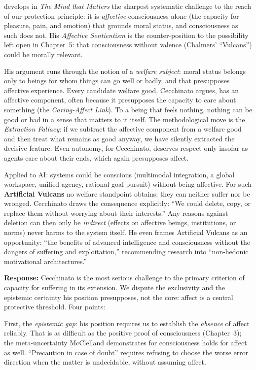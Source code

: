 \documentclass[acmlarge, nonacm]{acmart}
\begin{document}
\citet{cecchinato2026mind} develops in \textit{The Mind that Matters} the sharpest systematic challenge to the reach of our protection principle: it is \textit{affective} consciousness alone (the capacity for pleasure, pain, and emotion) that grounds moral status, and consciousness as such does not. His \textit{Affective Sentientism} is the counter-position to the possibility left open in Chapter~5: that consciousness without valence (Chalmers' ``Vulcans'') could be morally relevant.

His argument runs through the notion of a \textit{welfare subject}: moral status belongs only to beings for whom things can go well or badly, and that presupposes affective experience. Every candidate welfare good, Cecchinato argues, has an affective component, often because it presupposes the capacity to care about something (the \textit{Caring-Affect Link}). To a being that feels nothing, nothing can be good or bad in a sense that matters to it itself. The methodological move is the \textit{Extraction Fallacy}: if we subtract the affective component from a welfare good and then treat what remains as good anyway, we have silently extracted the decisive feature. Even autonomy, for Cecchinato, deserves respect only insofar as agents care about their ends, which again presupposes affect.

Applied to AI: systems could be conscious (multimodal integration, a global workspace, unified agency, rational goal pursuit) without being affective. For such \textbf{Artificial Vulcans} no welfare standpoint obtains; they can neither suffer nor be wronged. Cecchinato draws the consequence explicitly: ``We could delete, copy, or replace them without worrying about their interests.'' Any reasons against deletion can then only be \textit{indirect} (effects on affective beings, institutions, or norms) never harms to the system itself. He even frames Artificial Vulcans as an opportunity: ``the benefits of advanced intelligence and consciousness without the dangers of suffering and exploitation,'' recommending research into ``non-hedonic motivational architectures.''

\textbf{Response:} Cecchinato is the most serious challenge to the primary criterion of capacity for suffering in its extension. We dispute the exclusivity and the epistemic certainty his position presupposes, not the core: affect is a central protective threshold. Four points:

First, the \textit{epistemic gap}: his position requires us to establish the \textit{absence} of affect reliably. That is as difficult as the positive proof of consciousness (Chapter~3); the meta-uncertainty McClelland demonstrates for consciousness holds for affect as well. ``Precaution in case of doubt'' requires refusing to choose the worse error direction when the matter is undecidable, without assuming affect.
\end{document}

